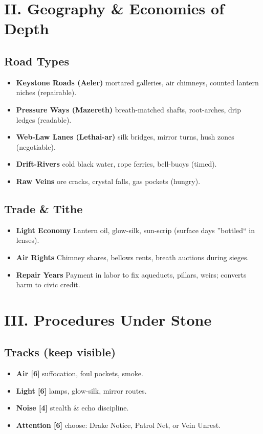 \documentclass[11pt]{article}
\begin{document}
\section{II. Geography \& Economies of Depth}

\subsection*{Road Types}
\begin{itemize}
    \item \textbf{Keystone Roads (Aeler)} mortared galleries, air chimneys, counted lantern niches (repairable).
    \item \textbf{Pressure Ways (Mazereth)} breath-matched shafts, root-arches, drip ledges (readable).
    \item \textbf{Web-Law Lanes (Lethai-ar)} silk bridges, mirror turns, hush zones (negotiable).
    \item \textbf{Drift-Rivers} cold black water, rope ferries, bell-buoys (timed).
    \item \textbf{Raw Veins} ore cracks, crystal falls, gas pockets (hungry).
\end{itemize}

\subsection*{Trade \& Tithe}
\begin{itemize}
    \item \textbf{Light Economy} Lantern oil, glow-silk, sun-scrip (surface days ''bottled`` in lenses).
    \item \textbf{Air Rights} Chimney shares, bellows rents, breath auctions during sieges.
    \item \textbf{Repair Years} Payment in labor to fix aqueducts, pillars, weirs; converts harm to civic credit.
\end{itemize}

\section{III. Procedures Under Stone}

\subsection*{Tracks (keep visible)}
\begin{itemize}
    \item \textbf{Air [6]} suffocation, foul pockets, smoke.
    \item \textbf{Light [6]} lamps, glow-silk, mirror routes.
    \item \textbf{Noise [4]} stealth \& echo discipline.
    \item \textbf{Attention [6]} choose: Drake Notice, Patrol Net, or Vein Unrest.
\end{itemize}
\end{document}
